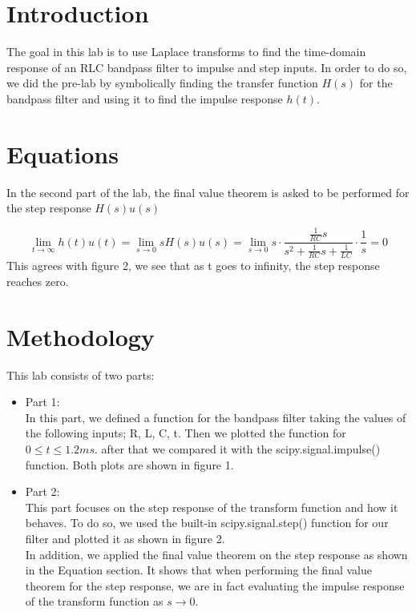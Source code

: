 \documentclass[12pt]{report}
\begin{document}
\section{Introduction}
The goal in this lab is to use Laplace transforms to find the time-domain response of an RLC bandpass filter to impulse and step inputs. In order to do so, we did the pre-lab by symbolically finding the transfer function $H(s)$ for the bandpass filter and using it to find the impulse response $h(t)$.

\section{Equations}
In the second part of the lab, the final value theorem is asked to be performed for the step response $H(s)u(s)$

$$\lim_{t\to \infty} h(t)u(t) = \lim_{s\to 0} sH(s)u(s)= \lim_{s\to 0} s\cdot \frac{\frac{1}{RC}s}{s^2+\frac{1}{RC}s+\frac{1}{LC}} \cdot \frac{1}{s} = 0 $$
This agrees with figure 2, we see that as t goes to infinity, the step response reaches zero.

\section{Methodology}

This lab consists of two parts:
\begin{itemize}
    \item
    Part 1:\\
    In this part, we defined a function for the bandpass filter taking the values of the following inputs; R, L, C, t. Then we plotted the function for $0 ≤ t ≤ 1.2 ms$. after that we compared it with the scipy.signal.impulse() function. Both plots are shown in figure 1.

    \item
    Part 2:\\
    This part focuses on the step response of the transform function and how it behaves. To do so, we used the built-in scipy.signal.step() function for our filter and plotted it as shown in figure 2.\\
    In addition, we applied the final value theorem on the step response as shown in the Equation section. It shows that when performing the final value theorem for the step response, we are in fact evaluating the impulse response of the transform function as $s\to 0$. 
\end{itemize}
   
\end{document}
